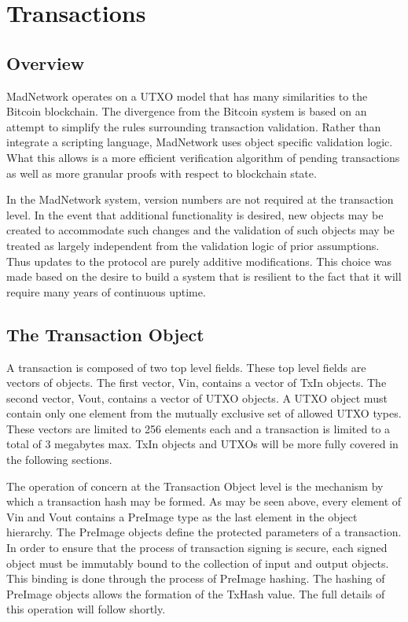 \section{Transactions}
\subsection{Overview}



MadNetwork operates on a UTXO model that has many similarities to the
Bitcoin blockchain.
The divergence from the Bitcoin system is based on an attempt to
simplify the rules surrounding transaction validation.
Rather than integrate a scripting language, MadNetwork uses object
specific validation logic.
What this allows is a more efficient verification algorithm of pending
transactions as well as more granular proofs with respect to blockchain
state.

In the MadNetwork system, version numbers are not required at the
transaction level.
In the event that additional functionality is desired, new objects may
be created to accommodate such changes and the validation of such
objects may be treated as largely independent from the validation logic
of prior assumptions.
Thus updates to the protocol are purely additive modifications.
This choice was made based on the desire to build a system that is
resilient to the fact that it will require many years of continuous
uptime.


\subsection{The Transaction Object}

A transaction is composed of two top level fields.
These top level fields are vectors of objects.
The first vector, Vin, contains a vector of TxIn objects.
The second vector, Vout, contains a vector of UTXO objects.
A UTXO object must contain only one element from the mutually exclusive set of
allowed UTXO types.
These vectors are limited to 256 elements each and a transaction is limited to
a total of 3 megabytes max.
TxIn objects and UTXOs will be more fully covered in the following sections.

The operation of concern at the Transaction Object level is the mechanism by
which a transaction hash may be formed.
As may be seen above, every element of Vin and Vout contains a PreImage type as
the last element in the object hierarchy.
The PreImage objects define the protected parameters of a transaction.
In order to ensure that the process of transaction signing is secure, each
signed object must be immutably bound to the collection of input and output
objects.
This binding is done through the process of PreImage hashing.
The hashing of PreImage objects allows the formation of the TxHash value.
The full details of this operation will follow shortly.

